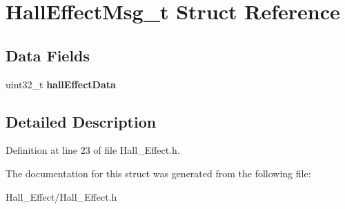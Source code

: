 \hypertarget{struct_hall_effect_msg__t}{}\section{Hall\+Effect\+Msg\+\_\+t Struct Reference}
\label{struct_hall_effect_msg__t}
\subsection*{Data Fields}
\begin{DoxyCompactItemize}
\item 
\hypertarget{struct_hall_effect_msg__t_af43ca84cb535e7ec6a4417b6a3ac6797}{}uint32\+\_\+t {\bfseries hall\+Effect\+Data}\label{struct_hall_effect_msg__t_af43ca84cb535e7ec6a4417b6a3ac6797}

\end{DoxyCompactItemize}


\subsection{Detailed Description}


Definition at line 23 of file Hall\+\_\+\+Effect.\+h.



The documentation for this struct was generated from the following file\+:\begin{DoxyCompactItemize}
\item 
Hall\+\_\+\+Effect/Hall\+\_\+\+Effect.\+h\end{DoxyCompactItemize}
